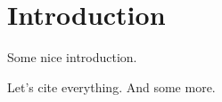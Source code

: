 \chapter{Introduction}\label{ch:introduction}
Some nice introduction.

Let's cite everything\cite{braemerPairLocalizationDipolar2022,eulerMetronomeSpinStabilizes2024,franzEmergentPairLocalization2022,franzObservationUniversalRelaxation2023,geierTimereversalDipolarQuantum2024,braemerClusterTruncatedWigner2024}. And some more\cite{luitzHowSmallQuantum2017,nandkishoreManyBodyLocalized2017}.